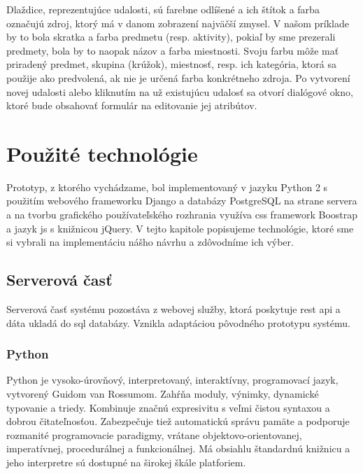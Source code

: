 Dlaždice, reprezentujúce udalosti, sú farebne odlíšené a ich štítok a farba
označujú zdroj, ktorý má v danom zobrazení najväčší zmysel. V našom príklade by
to bola skratka a farba predmetu (resp. aktivity), pokiaľ by sme prezerali
predmety, bola by to naopak názov a farba miestnosti. Svoju farbu môže mať
priradený predmet, skupina (krúžok), miestnosť, resp. ich kategória, ktorá sa
použije ako predvolená, ak nie je určená farba konkrétneho zdroja. Po vytvorení
novej udalosti alebo kliknutím na už existujúcu udalosť sa otvorí dialógové
okno, ktoré bude obsahovať formulár na editovanie jej atribútov.

\section{Použité technológie}
\label{sec:used_technologies}

Prototyp, z ktorého vychádzame, bol implementovaný v jazyku Python 2 s použitím
webového frameworku Django a databázy PostgreSQL na strane servera a na tvorbu
grafického používateľského rozhrania využíva \acrshort{css} framework Boostrap a
jazyk \acrlong{js} s knižnicou jQuery. V tejto kapitole popisujeme technológie,
ktoré sme si vybrali na implementáciu nášho návrhu a zdôvodníme ich výber.

\subsection{Serverová časť}
\label{sec:back_end}

Serverová časť systému pozostáva z webovej služby, ktorá poskytuje
\acrshort{rest} \acrshort{api} a dáta ukladá do \acrshort{sql} databázy. Vznikla
adaptáciou pôvodného prototypu systému.

\subsubsection{Python}

Python je vysoko-úrovňový, interpretovaný, interaktívny, programovací jazyk,
vytvorený Guidom van Rossumom. Zahŕňa moduly, výnimky, dynamické typovanie a
triedy. Kombinuje značnú expresivitu s veľmi čistou syntaxou a dobrou
čitateľnosťou. \cite{python_faq} Zabezpečuje tiež automatickú správu pamäte a
podporuje rozmanité programovacie paradigmy, vrátane objektovo-orientovanej,
imperatívnej, procedurálnej a funkcionálnej. Má obsiahlu štandardnú knižnicu a
jeho interpretre sú dostupné na širokej škále platforiem.

